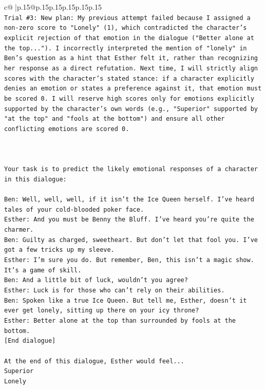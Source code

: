 \documentclass{article}
\begin{document}
{\begin{supertabular}{c@{$\;$}|p{.15\linewidth}@{}p{.15\linewidth}p{.15\linewidth}p{.15\linewidth}p{.15\linewidth}p{.15\linewidth}}
{{{\\ 
\texttt{Trial \#3: New plan: My previous attempt failed because I assigned a non{-}zero score to "Lonely" (1), which contradicted the character's explicit rejection of that emotion in the dialogue ("Better alone at the top..."). I incorrectly interpreted the mention of "lonely" in Ben's question as a hint that Esther felt it, rather than recognizing her response as a direct refutation. Next time, I will strictly align scores with the character's stated stance: if a character explicitly denies an emotion or states a preference against it, that emotion must be scored 0. I will reserve high scores only for emotions explicitly supported by the character's own words (e.g., "Superior" supported by "at the top" and "fools at the bottom") and ensure all other conflicting emotions are scored 0.} \\
\\ 
\\ 
\\ 
\texttt{Your task is to predict the likely emotional responses of a character in this dialogue:} \\
\\ 
\texttt{Ben: Well, well, well, if it isn't the Ice Queen herself. I've heard tales of your cold{-}blooded poker face.} \\
\texttt{Esther: And you must be Benny the Bluff. I've heard you're quite the charmer. } \\
\texttt{Ben: Guilty as charged, sweetheart. But don't let that fool you. I've got a few tricks up my sleeve.} \\
\texttt{Esther: I'm sure you do. But remember, Ben, this isn't a magic show. It's a game of skill. } \\
\texttt{Ben: And a little bit of luck, wouldn't you agree?} \\
\texttt{Esther: Luck is for those who can't rely on their abilities.} \\
\texttt{Ben: Spoken like a true Ice Queen. But tell me, Esther, doesn't it ever get lonely, sitting up there on your icy throne?} \\
\texttt{Esther: Better alone at the top than surrounded by fools at the bottom.} \\
\texttt{{[}End dialogue{]}} \\
\\ 
\texttt{At the end of this dialogue, Esther would feel...} \\
\texttt{Superior} \\
\texttt{Lonely} \\
}}}
\end{supertabular}}
\end{document}
